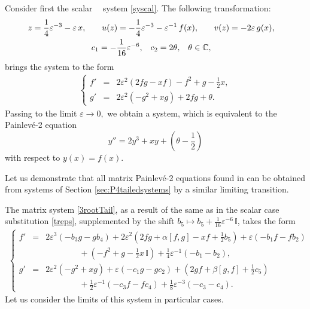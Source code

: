 \documentclass{article}
\theoremstyle{plain}
\newcommand{\brackets}[1]{\left( #1 \right)}
\DeclareMathOperator{\PIV}{P_{4}}
\begin{document}
Consider first the scalar $\PIV$ system \eqref{syscal}. The following transformation:
\begin{gather}
    \label{treps}
    \begin{aligned}
    z 
    &= \frac14 \varepsilon^{-3} - \varepsilon \, x, \quad 
    &
    u (z)
    &= - \frac14 \varepsilon^{- 3} - \varepsilon^{-1} \, f (x), \quad 
    &
    v (z)
    &= - 2 \varepsilon \, g (x),
    \end{aligned}
    \\
    \notag
    \begin{aligned}
    c_1
    &= - \frac{1}{16} \varepsilon^{-6},
    &
    c_2
    &= 2 \theta,
    &
    \theta 
    &\in \mathbb{C},
    \end{aligned}
\end{gather}
brings the system to the form
\begin{gather*}
    \left\{
    \begin{array}{lcl}
    f'
    &=& 2 \varepsilon^2 \brackets{2 f g - x f} - f^2 + g - \frac12 x,
    \\[2mm]
    g'
    &=& 2 \varepsilon^{2}
    \brackets{ - g^2 + x g} + 2 f g + \theta
    .
    \end{array}
    \right.
\end{gather*}
Passing to the limit $\varepsilon \to 0,$ we obtain a system, which is equivalent to the Painlev\'e-2 equation 
\begin{equation*}
    y''
    = 2 y^3 + x y + \brackets{\theta - \frac12}
\end{equation*}
with respect to  $y (x) = f (x)$.

Let us demonstrate that all matrix Painlev\'e-2 equations found in \cite{Adler_Sokolov_2020_1} can be obtained from systems of Section \ref{sec:P4tailedsystems} by a similar limiting transition. 

The matrix system \eqref{3rootTail}, as a result of the same  as in the scalar case substitution \eqref{treps}, supplemented by the shift $b_5 \mapsto b_5 + \frac{1}{16} \varepsilon^{-6} \, \mathbb{I}$, takes the form
\begin{gather} \label{eq:sys4tosys2}
    \left\{
    \begin{array}{lcl}
    f'
    &=& 2 \varepsilon^3 \brackets{- b_3 g - g b_4}
    + 2 \varepsilon^2 \brackets{2 f g + \alpha [f, g] - x f + \frac12 b_5}
    + \varepsilon \brackets{- b_1 f - f b_2}
    \\[3mm]
    && \qquad \qquad
    + \brackets{- f^2 + g - \frac12 x \, \mathbb{I}}
    + \frac14 \varepsilon^{-1} \brackets{- b_1 - b_2},
    \\[3mm]
    g'
    &=& 2 \varepsilon^2 \brackets{- g^2 + x g}
    + \varepsilon \brackets{- c_1 g - g c_2}
    + \brackets{2 g f + \beta [g, f] + \frac12 c_5}
    \\[3mm]
    && \qquad \qquad
    + \frac12 \varepsilon^{-1} \brackets{- c_3 f - f c_4}
    + \frac18 \varepsilon^{-3} \brackets{- c_3 - c_4}.
    \end{array}
    \right.
\end{gather}
Let us consider the limits of this system in particular cases.
\end{document}
